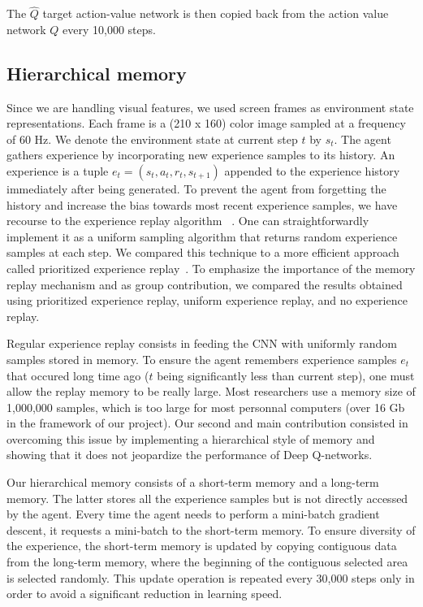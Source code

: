 \documentclass[letterpaper]{article}
\begin{document}
The $\hat Q$ target action-value network is then copied back from the action value network $Q$ every 10,000 steps.

\subsection{Hierarchical memory}

Since we are handling visual features, we used screen frames as environment state representations. Each frame is a (210 x 160) color image sampled at
a frequency of 60 Hz. We denote the environment state at current step $t$ by $s_t$. The agent gathers experience by incorporating new experience samples
to its history. An experience is a tuple $e_t = (s_t, a_t, r_t, s_{t+1})$ appended to the experience history immediately after being generated.
To prevent the agent from forgetting the history and increase the bias towards most recent experience samples, we have recourse to the experience
replay algorithm ~\citep{adam2012experience}. One can straightforwardly implement it as a uniform sampling algorithm that returns random experience samples at each step.
We compared this technique to a more efficient approach called prioritized experience replay~\citep{DBLP:journals/corr/SchaulQAS15}.
To emphasize the importance of the memory replay mechanism and as group contribution, we compared the results obtained using prioritized experience replay, uniform
experience replay, and no experience replay.

Regular experience replay consists in feeding the CNN with uniformly random samples stored in memory. To ensure the agent remembers experience samples $e_t$ that
occured long time ago ($t$ being significantly less than current step), one must allow the replay memory to be really large. Most researchers use a memory size
of 1,000,000 samples, which is too large for most personnal computers (over 16 Gb in the framework of our project). Our second and main contribution consisted in
overcoming this issue by implementing a hierarchical style of memory and showing that it does not jeopardize the performance of Deep Q-networks.

Our hierarchical memory consists of a short-term memory and a long-term memory. The latter stores all the experience samples but is not directly accessed by the agent.
Every time the agent needs to perform a mini-batch gradient descent, it requests a mini-batch to the short-term memory. To ensure diversity of the experience,
the short-term memory is updated by copying contiguous data from the long-term memory, where the beginning of the contiguous selected area is selected randomly.
This update operation is repeated every 30,000 steps only in order to avoid a significant reduction in learning speed.
\end{document}
